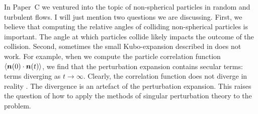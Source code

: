 \documentclass[thesis.tex]{subfiles}
\begin{document}
In Paper~C we ventured into the topic of non-spherical particles in random and turbulent flows. I will just mention two questions we are discussing. First, we believe that computing the relative angles of colliding non-spherical particles is important. The angle at which particles collide likely impacts the outcome of the collision. Second, sometimes the small Kubo-expansion described in  does not work. For example, when we compute the particle correlation function $\langle \mbox{\boldmath$n$}(0)\cdot\mbox{\boldmath$n$}(t)\rangle$, we find that the perturbation expansion contains secular terms: terms diverging as $t\to\infty$. Clearly, the correlation function does not diverge in reality \cite{pumir2011}. The divergence is an artefact of the perturbation expansion. This raises the question of how to apply the methods of singular perturbation theory to the problem.
\end{document}
